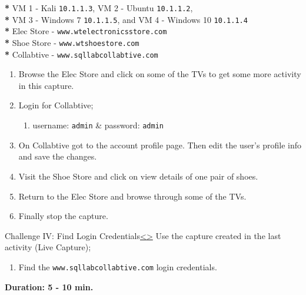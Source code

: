 \documentclass[12pt]{extarticle}
\newenvironment{instructionblock}{\Large\bgroup}{\egroup}
\newcommand{\ben}{\begin{enumerate}}
\newcommand{\een}{\end{enumerate}}
\begin{document}
	\vspace{4mm}
	\noindent
	\textbf{*} VM 1 - Kali \texttt{10.1.1.3}, VM 2 - Ubuntu \texttt{10.1.1.2},\\
	\textbf{*} VM 3 - Windows 7 \texttt{10.1.1.5}, and VM 4 - Windows 10 \texttt{10.1.1.4}\\
	{\textbf{*}} Elec Store - \texttt{www.wtelectronicsstore.com}\\
	{\textbf{*}} Shoe Store - \texttt{www.wtshoestore.com}\\
	{\textbf{*}} Collabtive - \texttt{www.sqllabcollabtive.com}
	
	
	\begin{enumerate}
		\item Browse the Elec Store and click on some of the TVs to get some more activity in this capture.
		
		\item Login for Collabtive;
		\ben
			\item username: \texttt{admin} \&	password: \texttt{admin}
		\een
		
		\item On Collabtive got to the account profile page. Then edit the user's profile info and save the changes.
		
		\item Visit the Shoe Store and click on view details of one pair of shoes.
		
		\item Return to the Elec Store and browse through some of the TVs.
		
		\item Finally stop the capture.
	\end{enumerate}
	
	
	
	
	\pagebreak
	\begin{slide}{Challenge IV: Find Login Credentials}{\hyperref[slide 30]{\textless}\hyperref[slide 32]{\textgreater}}
		\vskip 5pt
		\begin{instructionblock}
			Use the capture created in the last activity (Live Capture);
			\begin{enumerate}
				\item Find the \texttt{www.sqllabcollabtive.com} login credentials.
			\end{enumerate}
			
			\vspace{45mm}
			\begin{center}
				 \textbf{Duration: 5 - 10 min.}
			\end{center}
		\end{instructionblock}
	\end{slide}
	\vfill
	
\end{document}
